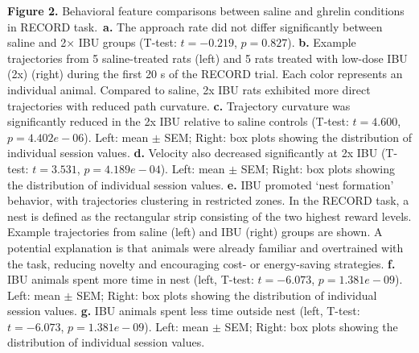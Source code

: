 \textbf{Figure 2.} Behavioral feature comparisons between saline and ghrelin conditions in RECORD task.\
\textbf{a.} The approach rate did not differ significantly between saline and 2× IBU groups (T-test: $t=-0.219$, $p=0.827$).
\textbf{b.} Example trajectories from 5 saline-treated rats (left) and 5 rats treated with low-dose IBU (2x) (right) during the first 20 s of the RECORD trial. Each color represents an individual animal. Compared to saline, 2x IBU rats exhibited more direct trajectories with reduced path curvature.
\textbf{c.} Trajectory curvature was significantly reduced in the 2x IBU relative to saline controls (T-test: $t=4.600$, $p=4.402e-06$). Left: mean $\pm$ SEM; Right: box plots showing the distribution of individual session values.
\textbf{d.} Velocity also decreased significantly at 2x IBU (T-test: $t=3.531$, $p=4.189e-04$). Left: mean $\pm$ SEM; Right: box plots showing the distribution of individual session values.
\textbf{e.} IBU promoted ‘nest formation’ behavior, with trajectories clustering in restricted zones. In the RECORD task, a nest is defined as the rectangular strip consisting of the two highest reward levels. Example trajectories from saline (left) and IBU (right) groups are shown. A potential explanation is that animals were already familiar and overtrained with the task, reducing novelty and encouraging cost- or energy-saving strategies.
\textbf{f.} IBU animals spent more time in nest (left, T-test: $t=-6.073$, $p=1.381e-09$). Left: mean $\pm$ SEM; Right: box plots showing the distribution of individual session values.
\textbf{g.} IBU animals spent less time outside nest (left, T-test: $t=-6.073$, $p=1.381e-09$). Left: mean $\pm$ SEM; Right: box plots showing the distribution of individual session values.

